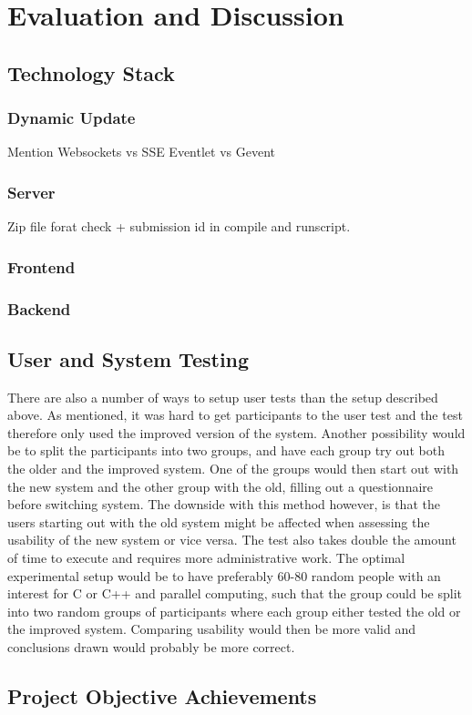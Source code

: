 \chapter{Evaluation and Discussion}

\section{Technology Stack}
\label{sec:eval-tech}

\subsection{Dynamic Update}
Mention Websockets vs SSE
Eventlet vs Gevent

\subsection{Server}
Zip file forat check + submission id in compile and runscript.

\subsection{Frontend}

\subsection{Backend}

\section{User and System Testing}
\label{sec:eval-user-testing}
There are also a number of ways to setup user tests than the setup described above. As mentioned, it was hard to get participants to the user test and the test therefore only used the improved version of the system. Another possibility would be to split the participants into two groups, and have each group try out both the older and the improved system. One of the groups would then start out with the new system and the other group with the old, filling out a questionnaire before switching system. The downside with this method however, is that the users starting out with the old system might be affected when assessing the usability of the new system or vice versa. The test also takes double the amount of time to execute and requires more administrative work. The optimal experimental setup would be to have preferably 60-80 random people with an interest for C or C++ and parallel computing, such that the group could be split into two random groups of participants where each group either tested the old or the improved system. Comparing usability would then be more valid and conclusions drawn would probably be more correct.

\section{Project Objective Achievements}
